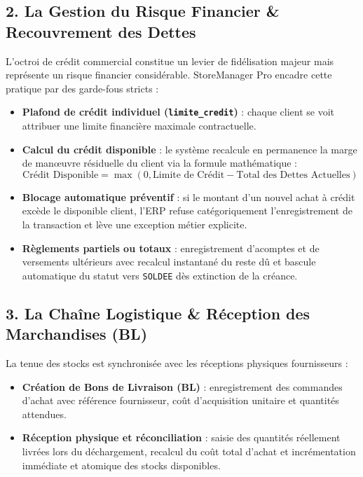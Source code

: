 \documentclass[11pt,a4paper,titlepage,twoside,openright]{report}
\begin{document}
\subsection{2. La Gestion du Risque Financier \& Recouvrement des Dettes}
L'octroi de crédit commercial constitue un levier de fidélisation majeur mais représente un risque financier considérable. StoreManager Pro encadre cette pratique par des garde-fous stricts :
\begin{itemize}
    \item \textbf{Plafond de crédit individuel (\texttt{limite\_credit})} : chaque client se voit attribuer une limite financière maximale contractuelle.
    \item \textbf{Calcul du crédit disponible} : le système recalcule en permanence la marge de manœuvre résiduelle du client via la formule mathématique :
    \begin{equation}
        \text{Crédit Disponible} = \max\left(0, \text{Limite de Crédit} - \text{Total des Dettes Actuelles}\right)
    \end{equation}
    \item \textbf{Blocage automatique préventif} : si le montant d'un nouvel achat à crédit excède le disponible client, l'ERP refuse catégoriquement l'enregistrement de la transaction et lève une exception métier explicite.
    \item \textbf{Règlements partiels ou totaux} : enregistrement d'acomptes et de versements ultérieurs avec recalcul instantané du reste dû et bascule automatique du statut vers \texttt{SOLDEE} dès extinction de la créance.
\end{itemize}

\subsection{3. La Chaîne Logistique \& Réception des Marchandises (BL)}
La tenue des stocks est synchronisée avec les réceptions physiques fournisseurs :
\begin{itemize}
    \item \textbf{Création de Bons de Livraison (BL)} : enregistrement des commandes d'achat avec référence fournisseur, coût d'acquisition unitaire et quantités attendues.
    \item \textbf{Réception physique et réconciliation} : saisie des quantités réellement livrées lors du déchargement, recalcul du coût total d'achat et incrémentation immédiate et atomique des stocks disponibles.
\end{itemize}
\end{document}
